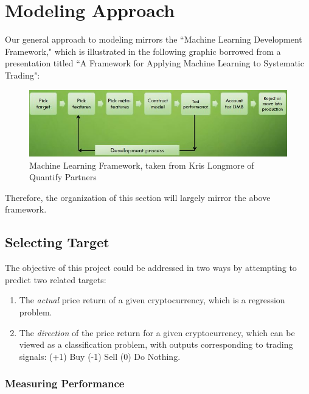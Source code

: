 \documentclass[12pt,twoside]{article}
\begin{document}
\section{Modeling Approach}

Our general approach to modeling mirrors the ``Machine Learning Development Framework," which is illustrated in the following graphic borrowed from a presentation titled ``A Framework for Applying Machine Learning to Systematic Trading":

\begin{figure}[H]
	\begin{center}
		\includegraphics[scale=1.0]{ml_framework_longmore}
		\caption{Machine Learning Framework, taken from Kris Longmore of Quantify Partners}
		\label{fig:ml_framework_longmore}
	\end{center}
\end{figure}

Therefore, the organization of this section will largely mirror the above framework.

\subsection{Selecting Target}

The objective of this project could be addressed in two ways by attempting to predict two related targets:
\begin{enumerate}
	\item The \textit{actual} price return of a given cryptocurrency, which is a regression problem.
	\item The \textit{direction} of the price return for a given cryptocurrency, which can be viewed as a classification problem, with outputs corresponding to trading signals: (+1) Buy (-1) Sell (0) Do Nothing.
\end{enumerate}

\subsubsection{Measuring Performance}
\end{document}

